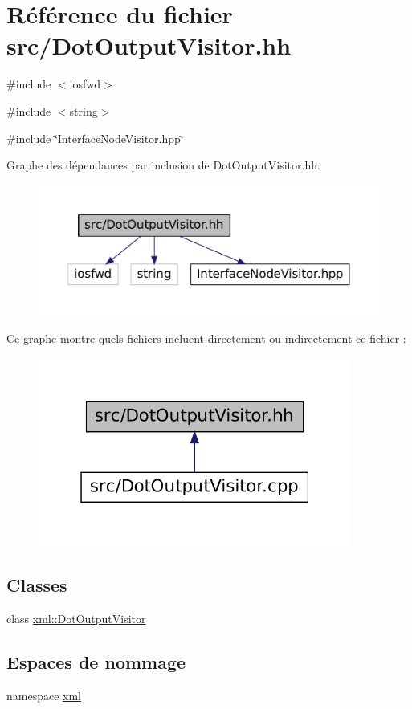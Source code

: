 \hypertarget{_dot_output_visitor_8hh}{
\section{Référence du fichier src/DotOutputVisitor.hh}
\label{_dot_output_visitor_8hh}
}
{\ttfamily \#include $<$iosfwd$>$}\par
{\ttfamily \#include $<$string$>$}\par
{\ttfamily \#include \char`\"{}InterfaceNodeVisitor.hpp\char`\"{}}\par
Graphe des dépendances par inclusion de DotOutputVisitor.hh:\nopagebreak
\begin{figure}[H]
\begin{center}
\leavevmode
\includegraphics[width=400pt]{_dot_output_visitor_8hh__incl}
\end{center}
\end{figure}
Ce graphe montre quels fichiers incluent directement ou indirectement ce fichier :\nopagebreak
\begin{figure}[H]
\begin{center}
\leavevmode
\includegraphics[width=292pt]{_dot_output_visitor_8hh__dep__incl}
\end{center}
\end{figure}
\subsection*{Classes}
\begin{DoxyCompactItemize}
\item 
class \hyperlink{classxml_1_1_dot_output_visitor}{xml::DotOutputVisitor}
\end{DoxyCompactItemize}
\subsection*{Espaces de nommage}
\begin{DoxyCompactItemize}
\item 
namespace \hyperlink{namespacexml}{xml}
\end{DoxyCompactItemize}
